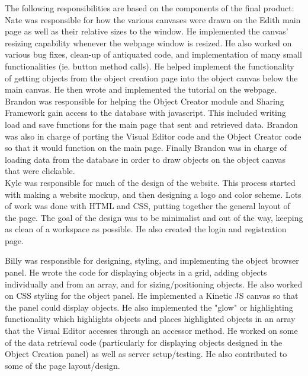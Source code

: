 \documentclass[12pt]{article}
\begin{document}
The following responsibilities are based on the components of the final product: \\

Nate was responsible for how the various canvases were drawn on the Edith main page as well as their relative sizes to the window. He implemented the canvas' resizing capability whenever the webpage window is resized. He also worked on various bug fixes, clean-up of antiquated code, and implementation of many small functionalities (ie. button method calls). He helped implement the functionality of getting objects from the object creation page into the object canvas below the main canvas. He then wrote and implemented the tutorial on the webpage. \\

Brandon was responsible for helping the Object Creator module and Sharing Framework gain access to the database with javascript.  This included writing load and save functions for the main page that sent and retrieved data.  Brandon was also in charge of porting the Visual Editor code and the Object Creator code so that it would function on the main page.  Finally Brandon was in charge of loading data from the database in order to draw objects on the object canvas that were clickable.  \\

Kyle was responsible for much of the design of the website. This process started with making a website mockup, and then designing a logo and color scheme. Lots of work was done with HTML and CSS, putting together the general layout of the page. The goal of the design was to be minimalist and out of the way, keeping as clean of a workspace as possible. He also created the login and registration page.


Billy was responsible for designing, styling, and implementing the object browser panel. He wrote the code for displaying objects in a grid, adding objects individually and from an array, and for sizing/positioning objects. He also worked on CSS styling for the object panel. He implemented a Kinetic JS canvas so that the panel could display objects. He also implemented the "glow" or highlighting functionality which highlights objects and places highlighted objects in an array that the Visual Editor accesses through an accessor method. He worked on some of the data retrieval code (particularly for displaying objects designed in the Object Creation panel) as well as server setup/testing. He also contributed to some of the page layout/design.
\end{document}
